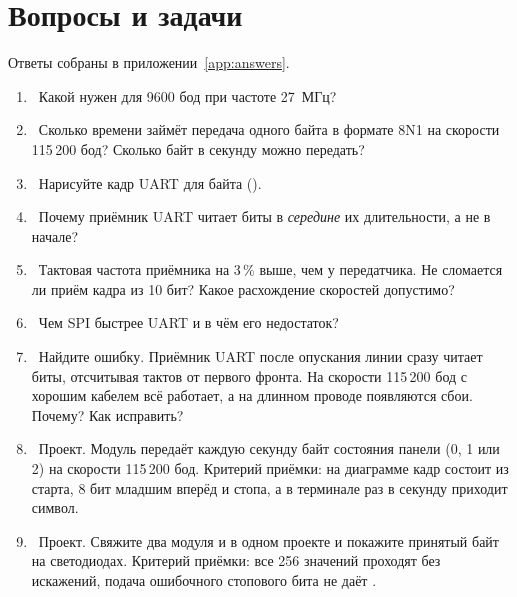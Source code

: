 \section{Вопросы и задачи}
\label{sec:tasks-uart}

Ответы собраны в приложении~\ref{app:answers}.

\begin{taskbox}
\begin{enumerate}
  \item {}~Какой  нужен для 9600 бод при частоте 27~МГц?
  \item {}~Сколько времени займёт передача одного байта в формате 8N1 на скорости
        115\,200 бод? Сколько байт в секунду можно передать?
  \item {}~Нарисуйте кадр UART для байта  ().
  \item {}~Почему приёмник UART читает биты в \emph{середине} их длительности, а не в начале?
  \item {}~Тактовая частота приёмника на 3\,\% выше, чем у передатчика. Не сломается
        ли приём кадра из 10 бит? Какое расхождение скоростей допустимо?
  \item {}~Чем SPI быстрее UART и в чём его недостаток?
  \item {}~Найдите ошибку. Приёмник UART после опускания линии сразу читает биты, отсчитывая
         тактов от первого фронта. На скорости 115\,200 бод с хорошим
        кабелем всё работает, а на длинном проводе появляются сбои. Почему? Как исправить?
  \item {}~Проект. Модуль передаёт каждую секунду байт состояния панели (0, 1 или 2)
        на скорости 115\,200 бод. Критерий приёмки: на диаграмме кадр состоит из
        старта, 8 бит младшим вперёд и стопа, а в терминале раз в секунду приходит символ.
  \item {}~Проект. Свяжите два модуля  и  в одном проекте
        и покажите принятый байт на светодиодах. Критерий приёмки: все 256 значений проходят
        без искажений, подача ошибочного стопового бита не даёт .
\end{enumerate}
\end{taskbox}
